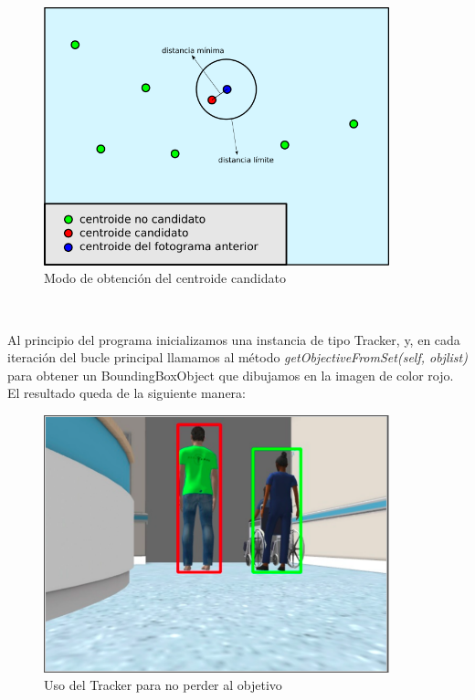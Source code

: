 \begin{figure} [H]
  \begin{center}
    \includegraphics[width=10cm]{imagenes/cap6/esquema-tracker.png}
  \end{center}
  \caption[Modo de obtención del centroide candidato]{Modo de obtención del centroide candidato}
  \label{fig:obtencion_centroide}
\end{figure}\

Al principio del programa inicializamos una instancia de tipo Tracker, y, en cada iteración del bucle principal llamamos al método \textit{getObjectiveFromSet(self, objlist)} para obtener un BoundingBoxObject que dibujamos en la imagen de color rojo. El resultado queda de la siguiente manera:\\

\begin{figure} [H]
  \begin{center}
    \includegraphics[width=10cm]{imagenes/cap6/aplicando-tracker.png}
  \end{center}
  \caption[Usando el Tracker para no perder al objetivo]{Uso del Tracker para no perder al objetivo}
  \label{fig:uso_tracker}
\end{figure}\

